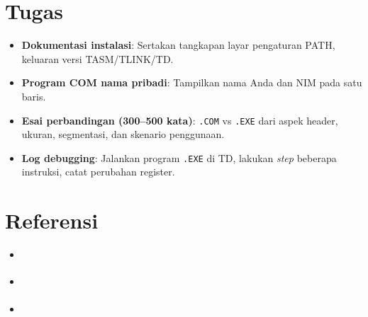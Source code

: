 \documentclass[../main.tex]{subfiles}
\begin{document}
\section{Tugas}
\begin{itemize}
  \item \textbf{Dokumentasi instalasi}: Sertakan tangkapan layar pengaturan PATH, keluaran versi TASM/TLINK/TD.
  \item \textbf{Program COM nama pribadi}: Tampilkan nama Anda dan NIM pada satu baris.
  \item \textbf{Esai perbandingan (300--500 kata)}: \texttt{.COM} vs \texttt{.EXE} dari aspek header, ukuran, segmentasi, dan skenario penggunaan.
  \item \textbf{Log debugging}: Jalankan program \texttt{.EXE} di TD, lakukan \textit{step} beberapa instruksi, catat perubahan register.
\end{itemize}

\section{Referensi}\label{sec:instalasi-referensi}
\begin{itemize}
    \item \cite{borland1990tasm}
    \item \cite{nasm_manual}
    \item \cite{dosbox_manual}
\end{itemize}
\end{document}
